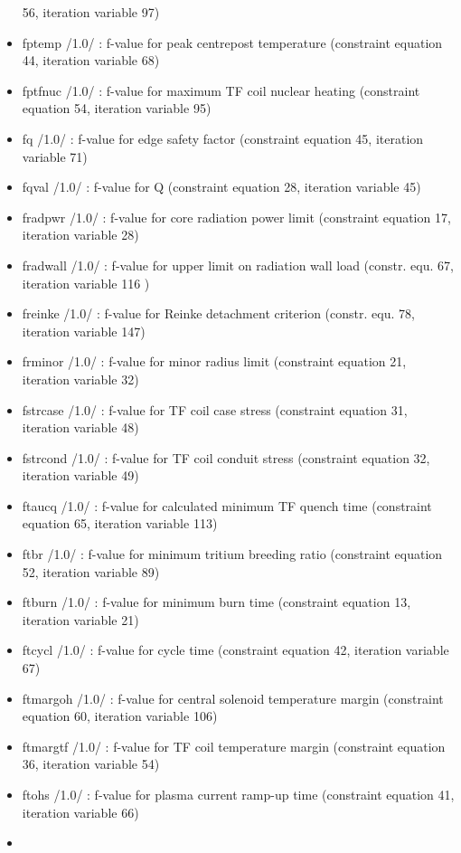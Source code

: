 \documentclass[]{article}
\begin{document}
\begin{itemize}
  56, iteration variable 97)
\item
  fptemp /1.0/ : f-value for peak centrepost temperature (constraint
  equation 44, iteration variable 68)
\item
  fptfnuc /1.0/ : f-value for maximum TF coil nuclear heating
  (constraint equation 54, iteration variable 95)
\item
  fq /1.0/ : f-value for edge safety factor (constraint equation 45,
  iteration variable 71)
\item
  fqval /1.0/ : f-value for Q (constraint equation 28, iteration
  variable 45)
\item
  fradpwr /1.0/ : f-value for core radiation power limit (constraint
  equation 17, iteration variable 28)
\item
  fradwall /1.0/ : f-value for upper limit on radiation wall load
  (constr. equ. 67, iteration variable 116 )
\item
  freinke /1.0/ : f-value for Reinke detachment criterion (constr. equ.
  78, iteration variable 147)
\item
  frminor /1.0/ : f-value for minor radius limit (constraint equation
  21, iteration variable 32)
\item
  fstrcase /1.0/ : f-value for TF coil case stress (constraint equation
  31, iteration variable 48)
\item
  fstrcond /1.0/ : f-value for TF coil conduit stress (constraint
  equation 32, iteration variable 49)
\item
  ftaucq /1.0/ : f-value for calculated minimum TF quench time
  (constraint equation 65, iteration variable 113)
\item
  ftbr /1.0/ : f-value for minimum tritium breeding ratio (constraint
  equation 52, iteration variable 89)
\item
  ftburn /1.0/ : f-value for minimum burn time (constraint equation 13,
  iteration variable 21)
\item
  ftcycl /1.0/ : f-value for cycle time (constraint equation 42,
  iteration variable 67)
\item
  ftmargoh /1.0/ : f-value for central solenoid temperature margin
  (constraint equation 60, iteration variable 106)
\item
  ftmargtf /1.0/ : f-value for TF coil temperature margin (constraint
  equation 36, iteration variable 54)
\item
  ftohs /1.0/ : f-value for plasma current ramp-up time (constraint
  equation 41, iteration variable 66)
\item

\end{itemize}
\end{document}
